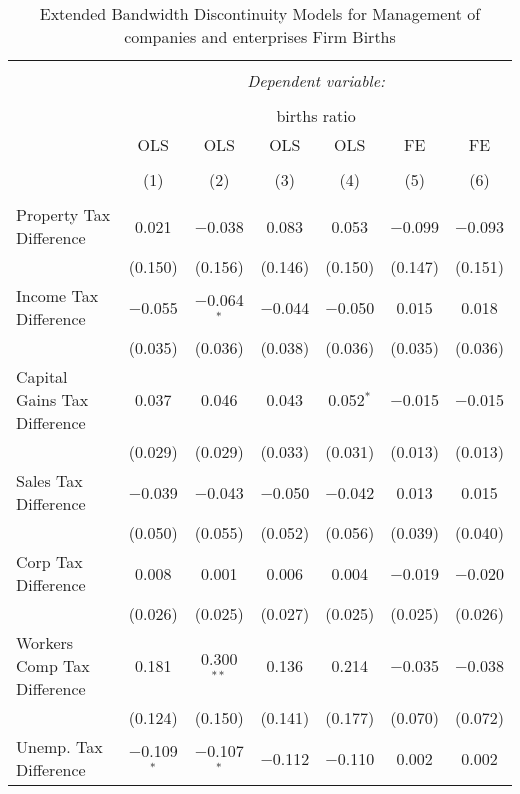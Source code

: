 
\begin{table}[!htbp] \centering 
  \caption{Extended Bandwidth Discontinuity Models for  Management of companies and enterprises Firm Births} 
  \label{55eb} 
\footnotesize 
\begin{tabular}{@{\extracolsep{5pt}}lcccccc} 
\\[-1.8ex]\hline 
\hline \\[-1.8ex] 
 & \multicolumn{6}{c}{\textit{Dependent variable:}} \\ 
\cline{2-7} 
\\[-1.8ex] & \multicolumn{6}{c}{births ratio} \\ 
 & OLS & OLS & OLS & OLS & FE & FE \\ 
\\[-1.8ex] & (1) & (2) & (3) & (4) & (5) & (6)\\ 
\hline \\[-1.8ex] 
 Property Tax Difference & 0.021 & $-$0.038 & 0.083 & 0.053 & $-$0.099 & $-$0.093 \\ 
  & (0.150) & (0.156) & (0.146) & (0.150) & (0.147) & (0.151) \\ 
  Income Tax Difference & $-$0.055 & $-$0.064$^{*}$ & $-$0.044 & $-$0.050 & 0.015 & 0.018 \\ 
  & (0.035) & (0.036) & (0.038) & (0.036) & (0.035) & (0.036) \\ 
  Capital Gains Tax Difference & 0.037 & 0.046 & 0.043 & 0.052$^{*}$ & $-$0.015 & $-$0.015 \\ 
  & (0.029) & (0.029) & (0.033) & (0.031) & (0.013) & (0.013) \\ 
  Sales Tax Difference & $-$0.039 & $-$0.043 & $-$0.050 & $-$0.042 & 0.013 & 0.015 \\ 
  & (0.050) & (0.055) & (0.052) & (0.056) & (0.039) & (0.040) \\ 
  Corp Tax Difference & 0.008 & 0.001 & 0.006 & 0.004 & $-$0.019 & $-$0.020 \\ 
  & (0.026) & (0.025) & (0.027) & (0.025) & (0.025) & (0.026) \\ 
  Workers Comp Tax Difference & 0.181 & 0.300$^{**}$ & 0.136 & 0.214 & $-$0.035 & $-$0.038 \\ 
  & (0.124) & (0.150) & (0.141) & (0.177) & (0.070) & (0.072) \\ 
  Unemp. Tax Difference & $-$0.109$^{*}$ & $-$0.107$^{*}$ & $-$0.112 & $-$0.110 & 0.002 & 0.002 \\ 

\end{tabular}
\end{table}
